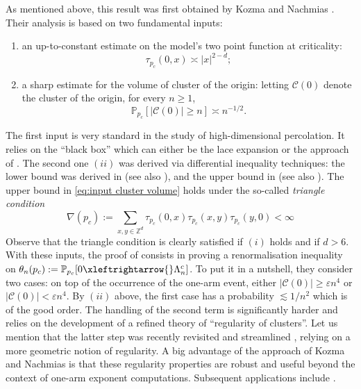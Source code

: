 \documentclass[11pt,a4paper]{article}
\numberwithin{equation}{section}
\theoremstyle{plain}
\theoremstyle{definition}
\newcommand{\connect}{\xleftrightarrow}
\newcommand{\1}{\mathbf 1}
\begin{document}
	As mentioned above, this result was first obtained by Kozma and Nachmias \cite{KozmaNachmias}. Their analysis is based on two fundamental inputs: 
	\begin{enumerate}
		\item[$(i)$] an up-to-constant estimate on the model's two point function at criticality: 
		\begin{equation}
			\tau_{p_c}(0,x)\asymp |x|^{2-d};
		\end{equation}
		\item[$(ii)$] a sharp estimate for the volume of cluster of the origin: letting $\mathcal C(0)$ denote the cluster of the origin, for every $n\geq 1$, 
		\begin{equation}\label{eq:input cluster volume}
			\mathbb P_{p_c}[|\mathcal C(0)|\geq n]\asymp n^{-1/2}.
		\end{equation} 
	\end{enumerate}
	The first input is very standard in the study of high-dimensional percolation. It relies on the ``black box'' which can either be the lace expansion or the approach of \cite{DumPan24Perco}. The second one $(ii)$ was derived via differential inequality techniques: the lower bound was derived in \cite{AizenmanBarsky1987sharpnessPerco} (see also \cite{DuminilTassionNewProofSharpness2016}), and the upper bound in \cite{BarskyAizenmanCriticalExponentPercoUnderTriangle1991} (see also \cite{hutchcroft2022derivation}). The upper bound in \eqref{eq:input cluster volume} holds under the so-called \emph{triangle condition}
	\begin{equation}\label{eq:triangle condition}
		\nabla(p_c):=\sum_{x,y\in \mathbb Z^d}\tau_{p_c}(0,x)\tau_{p_c}(x,y)\tau_{p_c}(y,0)<\infty
	\end{equation}
	Observe that the triangle condition is clearly satisfied if $(i)$ holds and if $d>6$. With these inputs, the proof of \cite{KozmaNachmias} consists in proving a renormalisation inequality on $\theta_n(p_c):=\mathbb P_{p_c}[0\connect{} \Lambda_n^c]$. To put it in a nutshell, they consider two cases: on top of the occurrence of the one-arm event, either $|\mathcal C(0)|\geq \varepsilon n^4$ or $|\mathcal C(0)|<\varepsilon n^4$. By $(ii)$ above, the first case has a probability $\lesssim 1/n^2$ which is of the good order. The handling of the second term is significantly harder and relies on the development of a refined theory of ``regularity of clusters''. Let us mention that the latter step was recently revisited and streamlined \cite{asselah2025capacity}, relying on a more geometric notion of regularity. A big advantage of the approach of Kozma and Nachmias is that these regularity properties are robust and useful beyond the context of one-arm exponent computations. Subsequent applications include \cite{vdHofstadSapoS14,ChatterjeeHanson,ChatterjeeHansonSosoe2023subcritical,chatterjee2025robust,asselah2025capacity}.
	 	
\end{document}

